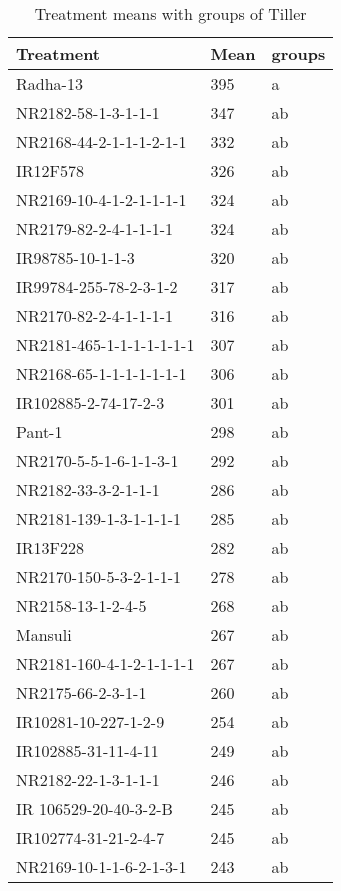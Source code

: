 \documentclass[]{article}
\begin{document}
\begin{longtable}{lll}
\caption{\label{tab:two-fac-groups-tab1}Treatment means with groups of Tiller}\\
\toprule
Treatment & Mean & groups\\
\midrule
\rowcolor{gray!6}  Radha-13 & 395 & a\\
NR2182-58-1-3-1-1-1 & 347 & ab\\
\rowcolor{gray!6}  NR2168-44-2-1-1-1-2-1-1 & 332 & ab\\
IR12F578 & 326 & ab\\
\rowcolor{gray!6}  NR2169-10-4-1-2-1-1-1-1 & 324 & ab\\
\addlinespace
NR2179-82-2-4-1-1-1-1 & 324 & ab\\
\rowcolor{gray!6}  IR98785-10-1-1-3 & 320 & ab\\
IR99784-255-78-2-3-1-2 & 317 & ab\\
\rowcolor{gray!6}  NR2170-82-2-4-1-1-1-1 & 316 & ab\\
NR2181-465-1-1-1-1-1-1-1 & 307 & ab\\
\addlinespace
\rowcolor{gray!6}  NR2168-65-1-1-1-1-1-1-1 & 306 & ab\\
IR102885-2-74-17-2-3 & 301 & ab\\
\rowcolor{gray!6}  Pant-1 & 298 & ab\\
NR2170-5-5-1-6-1-1-3-1 & 292 & ab\\
\rowcolor{gray!6}  NR2182-33-3-2-1-1-1 & 286 & ab\\
\addlinespace
NR2181-139-1-3-1-1-1-1 & 285 & ab\\
\rowcolor{gray!6}  IR13F228 & 282 & ab\\
NR2170-150-5-3-2-1-1-1 & 278 & ab\\
\rowcolor{gray!6}  NR2158-13-1-2-4-5 & 268 & ab\\
Mansuli & 267 & ab\\
\addlinespace
\rowcolor{gray!6}  NR2181-160-4-1-2-1-1-1-1 & 267 & ab\\
NR2175-66-2-3-1-1 & 260 & ab\\
\rowcolor{gray!6}  IR10281-10-227-1-2-9 & 254 & ab\\
IR102885-31-11-4-11 & 249 & ab\\
\rowcolor{gray!6}  NR2182-22-1-3-1-1-1 & 246 & ab\\
\addlinespace
IR 106529-20-40-3-2-B & 245 & ab\\
\rowcolor{gray!6}  IR102774-31-21-2-4-7 & 245 & ab\\
NR2169-10-1-1-6-2-1-3-1 & 243 & ab\\

\end{longtable}
\end{document}
